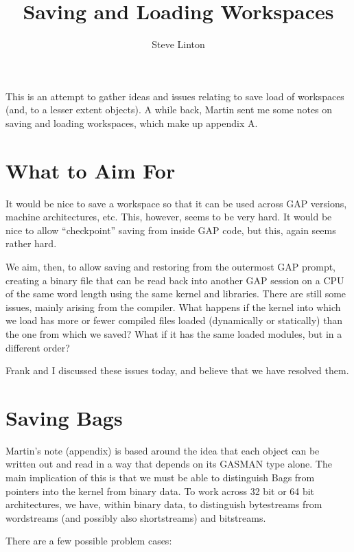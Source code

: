 \documentclass[11pt]{article}
\title{Saving and Loading Workspaces}
\author{Steve Linton}
\begin{document}
\maketitle

This is an attempt to gather ideas and issues relating to save load of
workspaces (and, to a lesser extent objects). A while back, Martin
sent me some notes on saving and loading workspaces, which make up
appendix A.

\section{What to Aim For}

It would be nice to save a workspace so that it can be used across GAP
versions, machine architectures, etc. This, however, seems to be very
hard. It would be nice to allow ``checkpoint'' saving from inside GAP
code, but this, again seems rather hard.

We aim, then, to allow saving and restoring from the outermost GAP
prompt, creating a binary file that can be read back into another GAP
session on a CPU of the same word length using the same kernel and
libraries. There are still some issues, mainly arising from the
compiler. What happens if the kernel into which we load has more or
fewer compiled files loaded (dynamically or statically) than the one
from which we saved? What if it has the same loaded modules, but in a
different order? 

Frank and I discussed these issues today, and believe that we have
resolved them.

\section{Saving Bags}

Martin's note (appendix) is based around the idea that each object can
be written out and read in a way that depends on its GASMAN type
alone. The main implication of this is that we must be able to
distinguish Bags from pointers into the kernel from binary data. To
work across 32 bit or 64 bit architectures, we have, within binary
data, to distinguish bytestreams from wordstreams (and possibly also
shortstreams) and bitstreams.

There are a few possible problem cases:
\end{document}
